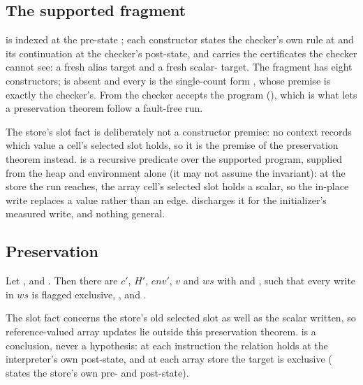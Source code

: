 \documentclass[a4paper,UKenglish,cleveref]{lipics-v2021}
\begin{document}
\subsection{The supported fragment}\label{sec:supported}
 is indexed at the pre-state ; each constructor states
the checker's own rule at  and its continuation at the checker's
post-state, and carries the certificates the checker cannot see: a fresh alias
target and a fresh scalar- target. The fragment has eight
constructors;  is absent and every  is the single-count form
, whose premise  is exactly the checker's.
From  the checker accepts the program
(), which is what lets a preservation theorem follow a
fault-free run.

The store's slot fact is deliberately not a constructor premise: no context
records which value a cell's selected slot holds, so it is the 
premise of the preservation theorem instead.  is a
recursive predicate over the supported program, supplied from the heap and
environment alone (it may not assume the invariant): at the store the run reaches,
the array cell's selected slot holds a scalar, so the in-place write replaces a
value rather than an edge.  discharges it for the
initializer's measured write, and nothing general.

\subsection{Preservation}\label{sec:preservation}
\begin{theorem}\label{thm:supported-run}
Let ,  and
. Then there are $c'$, $H'$, $\mathit{env}'$, $v$ and
$ws$ with  and ,
such that every write in $ws$ is flagged exclusive,
, and
.
\end{theorem}
The slot fact concerns the store's old selected slot as well as the scalar written,
so reference-valued array updates lie outside this preservation theorem.
 is a conclusion, never a hypothesis: at each instruction the
relation holds at the interpreter's own post-state, and at each array store the
target is exclusive ( states the store's own pre-
and post-state).
\end{document}
